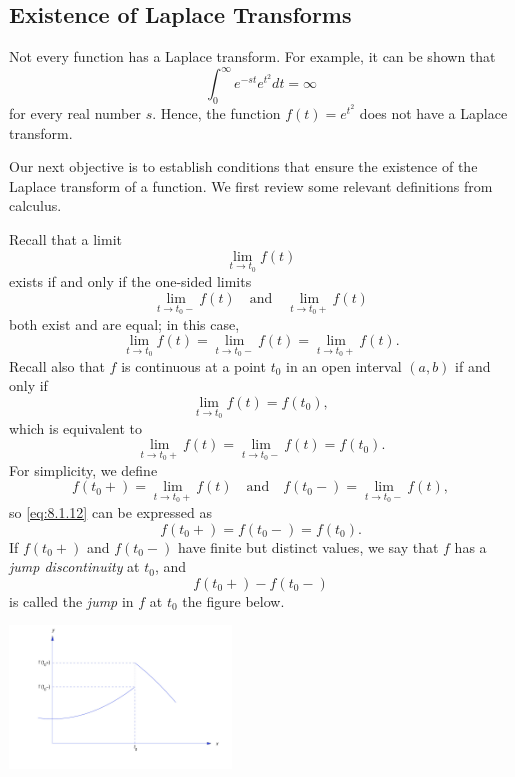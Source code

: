 \documentclass{ximera}
\begin{document}
\subsection*{Existence of Laplace Transforms}

Not every function has a Laplace transform.  For example, it can be shown
that
$$
\int_0^\infty e^{-st}e^{t^2} dt=\infty
$$
for every real number $s$. Hence, the function $f(t)=e^{t^2}$ does not
have a Laplace transform.

Our next objective is to establish conditions that ensure the
existence of the Laplace transform of a function. We first review some
relevant definitions from calculus.

Recall that a limit
$$
\lim_{t\rightarrow t_0} f(t)
$$
exists if and only if the one-sided limits
$$
\lim_{t\rightarrow t_0-}f(t)\quad\mbox{and}\quad\lim_{t\rightarrow t_0+}f(t)
$$
  both exist and are equal;   in this case,
$$
\lim_{t\rightarrow t_0}f(t)=\lim_{t\rightarrow t_0-}f(t)=\lim_{t\rightarrow t_0+}f(t) .
$$
Recall also that $f$ is continuous at a point $t_0$ in an open interval
$(a,b)$ if and only if
$$
\lim_{t\rightarrow t_0}f(t)=f(t_0),
$$
which is  equivalent to
\begin{equation}\label{eq:8.1.12}
\lim_{t\rightarrow t_0+}f(t)=\lim_{t\rightarrow t_0-}f(t)=f(t_0).
\end{equation}
For simplicity, we  define
$$
f(t_0+)=\lim_{t\rightarrow t_0+}f(t)\quad\mbox{and}\quad f(t_0-)=\lim_{t\rightarrow
t_0-}f(t),
$$
so  \eqref{eq:8.1.12} can be expressed as
$$
f(t_0+)=f(t_0-)=f(t_0).
$$
If $f(t_0+)$ and $f(t_0-)$ have finite but distinct values,  we say
that $f$ has a \textit{jump discontinuity}  at $t_0$,
 and
$$
f(t_0+)-f(t_0-)
$$
is called the \textit{jump} in $f$ at $t_0$ the figure below.

\begin{image}
 \includegraphics[height=1.5in]{fig080101.jpg}
\end{image}

\end{document}
